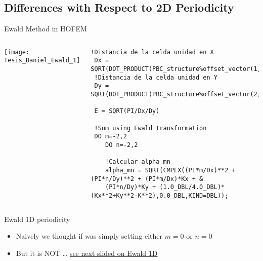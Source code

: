 %
%

  \subsection{Differences with Respect to 2D Periodicity}

    \begin{frame}{\GreenTEw}

    
    \begin{block}{Ewald Method in HOFEM}
    \begin{columns}[T]
      \texttt{[image: Tesis\_Daniel\_Ewald\_1]} 
      \begin{lstlisting}[style=myFORTRANcodeS,basicstyle=\ttfamily\tiny]
!Distancia de la celda unidad en X
 Dx = SQRT(DOT_PRODUCT(PBC_structure%offset_vector(1,:),PBC_structure%offset_vector(1,:)))
 !Distancia de la celda unidad en Y
 Dy = SQRT(DOT_PRODUCT(PBC_structure%offset_vector(2,:),PBC_structure%offset_vector(2,:)))
    
 E = SQRT(PI/Dx/Dy)

 !Sum using Ewald transformation
 DO m=-2,2
    DO n=-2,2

    !Calcular alpha_mn
    alpha_mn = SQRT(CMPLX((PI*m/Dx)**2 + (PI*n/Dy)**2 + (PI*m/Dx)*Kx + &
    (PI*n/Dy)*Ky + (1.0_DBL/4.0_DBL)*(Kx**2+Ky**2-K**2),0.0_DBL,KIND=DBL));
      \end{lstlisting}
    \end{columns}
  \end{block}


  \begin{block}{Ewald 1D periodicity}
    \begin{itemize}
    \item Naively we thought if was simply setting
      either $m=0$ or $n=0$
    \item \alert{But it is NOT} \ldots
      \hyperlink{Ewald1D}{see next slided on Ewald 1D}
    \end{itemize}
  \end{block}

  \end{frame}

